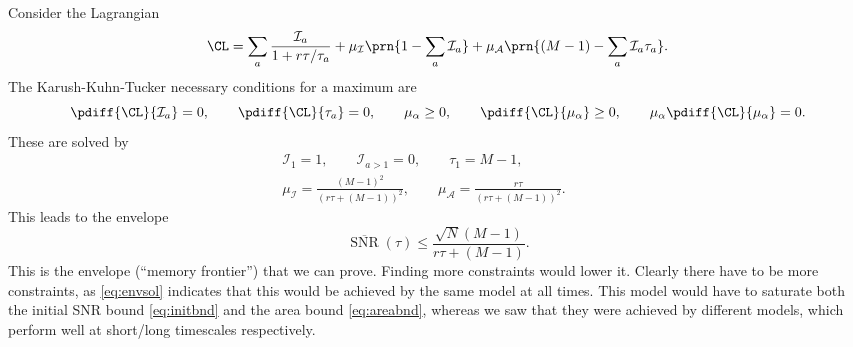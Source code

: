 \documentclass[12pt]{article}
\DeclareMathOperator{\snr}{SNR}
\newcommand{\snrb}{\overline{\snr}}
\newcommand{\CI}{\mathcal{I}}
\newcommand{\CA}{\mathcal{A}}
\begin{document}
Consider the Lagrangian
%
\begin{equation}\label{eq:envlagrangian}
  \CL = \sum_a \frac{\CI_a}{1+r\tau/\tau_a} + \mu_\CI \prn{1 - \sum_a \CI_a} + \mu_\CA \prn{(M-1) - \sum_a \CI_a \tau_a}.
\end{equation}
%
The Karush-Kuhn-Tucker necessary conditions for a maximum are
%
\begin{equation}\label{eq:envKTcond}
  \pdiff{\CL}{\CI_a} = 0, \qquad
  \pdiff{\CL}{\tau_a} = 0, \qquad
  \mu_\alpha \geq 0, \qquad
  \pdiff{\CL}{\mu_\alpha} \geq 0, \qquad
  \mu_\alpha\pdiff{\CL}{\mu_\alpha} = 0.
\end{equation}
%
These are solved by
%
\begin{equation}\label{eq:envsol}
\begin{gathered}
  \CI_1 = 1, \qquad
  \CI_{a>1} = 0, \qquad
  \tau_1 = M-1, \\
  \mu_\CI = \frac{(M-1)^2}{(r\tau + (M-1))^2}, \qquad
  \mu_\CA = \frac{r\tau}{(r\tau+(M-1))^2}. \qquad
\end{gathered}
\end{equation}
%
This leads to the envelope
%
\begin{equation}\label{eq:env}
  \snrb(\tau) \leq \frac{\sqrt{N}(M-1)}{r\tau + (M-1)}.
\end{equation}
%
This is the envelope (``memory frontier'') that we can prove.
Finding more constraints would lower it.
Clearly there have to be more constraints, as \eqref{eq:envsol} indicates that this would be achieved by the same model at all times.
This model would have to saturate both the initial SNR bound \eqref{eq:initbnd} and the area bound \eqref{eq:areabnd}, whereas we saw that they were achieved by different models, which perform well at short/long timescales respectively.































\end{document}
